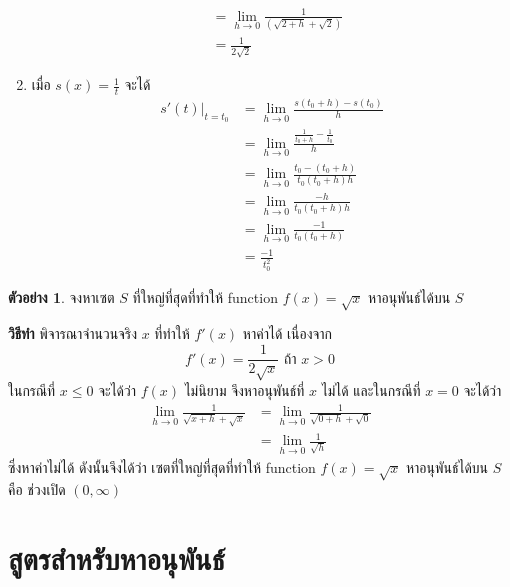 \documentclass[
]{book}
\theoremstyle{definition}
\theoremstyle{definition}
\newtheorem{example}{ตัวอย่าง}[chapter]
\theoremstyle{definition}
\theoremstyle{definition}
\theoremstyle{remark}
\begin{document}
\begin{enumerate}
\begin{equation}
\begin{aligned}
                  &= \underset{h \rightarrow 0}{\lim}\frac{1}{(\sqrt{2+h} + \sqrt{2})} \\
                  &= \frac{1}{2\sqrt{2}}
    \end{aligned} \end{equation}
\item
  เมื่อ \(s(x) = \frac{1}{t}\) จะได้ \begin{equation}   \begin{aligned}
              s'(t)|_{t=t_0} &= \underset{h \rightarrow 0}{\lim}\frac{s(t_0+h) - s(t_0)}{h} \\
                  &= \underset{h \rightarrow 0}{\lim}\frac{\frac{1}{t_0+h}-\frac{1}{t_0}}{h} \\
                  &= \underset{h \rightarrow 0}{\lim}\frac{t_0-(t_0+h)}{t_0(t_0+h)h} \\
                  &= \underset{h \rightarrow 0}{\lim}\frac{-h}{t_0(t_0+h)h} \\
                  &= \underset{h \rightarrow 0}{\lim}\frac{-1}{t_0(t_0+h)} \\
                  &= \frac{-1}{t_0^2}
    \end{aligned} \end{equation}
\end{enumerate}

\begin{example}
จงหาเซต \(S\) ที่ใหญ่ที่สุดที่ทำให้ function \(f(x) = \sqrt{x}\) หาอนุพันธ์ได้บน \(S\)
\end{example}

\textbf{วิธีทำ} พิจารณาจำนวนจริง \(x\) ที่ทำให้ \(f'(x)\) หาค่าได้ เนื่องจาก
\[f'(x) = \frac{1}{2\sqrt{x}}  \text{ ถ้า } x>0\] ในกรณีที่ \(x \le 0\) จะได้ว่า
\(f(x)\) ไม่นิยาม จึงหาอนุพันธ์ที่ \(x\) ไม่ได้ และในกรณีที่ \(x=0\) จะได้ว่า
\begin{equation}   \begin{aligned}
    \underset{h \rightarrow 0}{\lim}\frac{1}{\sqrt{x+h}+\sqrt{x}}
    &=\underset{h \rightarrow 0}{\lim}\frac{1}{\sqrt{0+h}+\sqrt{0}} \\
    &=\underset{h \rightarrow 0}{\lim}\frac{1}{\sqrt{h}}
  \end{aligned} \end{equation} ซึ่งหาค่าไม่ได้ ดังนั้นจึงได้ว่า เซตที่ใหญ่ที่สุดที่ทำให้ function
\(f(x) = \sqrt{x}\) หาอนุพันธ์ได้บน \(S\) คือ ช่วงเปิด \((0,\infty)\)

\section{สูตรสำหรับหาอนุพันธ์}\label{uxe2auxe15uxe23uxe2auxe33uxe2buxe23uxe1auxe2buxe32uxe2duxe19uxe1euxe19uxe18}
\end{document}
